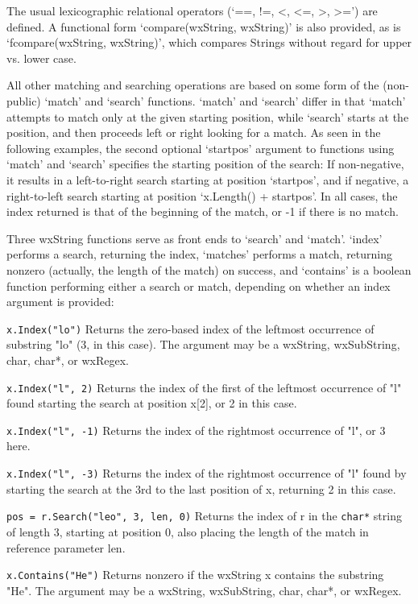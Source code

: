 The usual lexicographic relational operators (`==, !=, <, <=, >, >=')
are defined. A functional form `compare(wxString, wxString)' is also
provided, as is `fcompare(wxString, wxString)', which compares Strings
without regard for upper vs. lower case.

All other matching and searching operations are based on some form
of the (non-public) `match' and `search' functions.  `match' and
`search' differ in that `match' attempts to match only at the given
starting position, while `search' starts at the position, and then
proceeds left or right looking for a match.  As seen in the following
examples, the second optional `startpos' argument to functions using
`match' and `search' specifies the starting position of the search: If
non-negative, it results in a left-to-right search starting at position
`startpos', and if negative, a right-to-left search starting at
position `x.Length() + startpos'. In all cases, the index returned is
that of the beginning of the match, or -1 if there is no match.

Three wxString functions serve as front ends to `search' and `match'.
`index' performs a search, returning the index, `matches' performs a
match, returning nonzero (actually, the length of the match) on success,
and `contains' is a boolean function performing either a search or
match, depending on whether an index argument is provided:

{\tt x.Index("lo")} 
Returns the zero-based index of the leftmost occurrence of
substring "lo" (3, in this case).  The argument may be a wxString,
wxSubString, char, char*, or wxRegex.

{\tt x.Index("l", 2)} 
Returns the index of the first of the leftmost occurrence of "l"
found starting the search at position x[2], or 2 in this case.

{\tt x.Index("l", -1)} 
Returns the index of the rightmost occurrence of "l", or 3 here.

{\tt x.Index("l", -3)} 
Returns the index of the rightmost occurrence of "l" found by
starting the search at the 3rd to the last position of x,
returning 2 in this case.

{\tt pos = r.Search("leo", 3, len, 0)} 
Returns the index of r in the {\tt char*} string of length 3, starting
at position 0, also placing the  length of the match in reference
parameter len.

{\tt x.Contains("He")} 
Returns nonzero if the wxString x contains the substring "He". The
argument may be a wxString, wxSubString, char, char*, or wxRegex.

